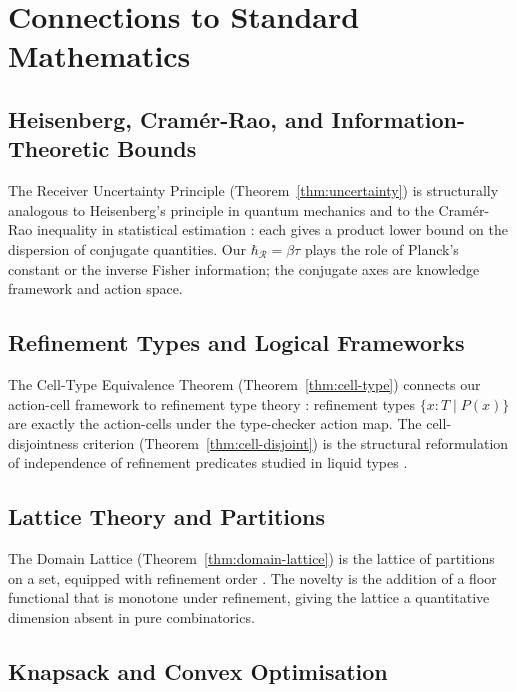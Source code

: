 \documentclass[twocolumn,11pt,a4paper]{article}
\newcommand{\receiver}{\mathcal{R}}
\newcommand{\hbarR}{\hbar_{\receiver}}
\begin{document}
\section{Connections to Standard Mathematics}
\label{sec:connections}

\subsection{Heisenberg, Cramér-Rao, and Information-Theoretic Bounds}

The Receiver Uncertainty Principle (Theorem~\ref{thm:uncertainty}) is structurally analogous to Heisenberg's principle in quantum mechanics \citep{heisenberg1927,kennard1927,robertson1929} and to the Cramér-Rao inequality in statistical estimation \citep{rao1945information,cramer1946mathematical}: each gives a product lower bound on the dispersion of conjugate quantities. Our $\hbarR = \beta \tau$ plays the role of Planck's constant or the inverse Fisher information; the conjugate axes are knowledge framework and action space.

\subsection{Refinement Types and Logical Frameworks}

The Cell-Type Equivalence Theorem (Theorem~\ref{thm:cell-type}) connects our action-cell framework to refinement type theory \citep{rondon2008liquid,vazou2014refinement,pierce2002types}: refinement types $\{x : T \mid P(x)\}$ are exactly the action-cells under the type-checker action map. The cell-disjointness criterion (Theorem~\ref{thm:cell-disjoint}) is the structural reformulation of independence of refinement predicates studied in liquid types \citep{rondon2008liquid}.

\subsection{Lattice Theory and Partitions}

The Domain Lattice (Theorem~\ref{thm:domain-lattice}) is the lattice of partitions on a set, equipped with refinement order \citep{birkhoff1948lattice,davey2002introduction}. The novelty is the addition of a floor functional that is monotone under refinement, giving the lattice a quantitative dimension absent in pure combinatorics.

\subsection{Knapsack and Convex Optimisation}
\end{document}
